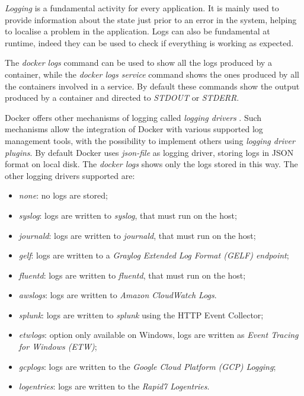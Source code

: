 \documentclass[a4paper,12pt]{article}
\begin{document}
\textit{Logging} is a fundamental activity for every application. It is mainly
used to provide information about the state just prior to an error in the
system, helping to localise a problem in the application. Logs can also be
fundamental at runtime, indeed they can be used to check if everything is
working as expected. \par The \textit{docker logs} command can be used to show
all the logs produced by a container, while the \textit{docker logs service}
command shows the ones produced by all the containers involved in a service. By
default these commands show the output produced by a container and directed to
\textit{STDOUT} or \textit{STDERR}. \par Docker offers other mechanisms of
logging called \textit{logging drivers} \cite{docker_logging_driver}. Such
mechanisms allow the integration of Docker with various supported log management
tools, with the possibility to implement others using \textit{logging driver
plugins}. By default Docker uses \textit{json-file} as logging driver, storing
logs in JSON format on local disk. The \textit{docker logs} shows only the logs
stored in this way. The other logging drivers supported are: 
\begin{itemize}
  \item \textit{none}: no logs are stored;
  \item \textit{syslog}: logs are written to \textit{syslog}, that must run on
  the host;
  \item \textit{journald}: logs are written to \textit{journald}, that must run on
  the host;
  \item \textit{gelf}: logs are written to a \textit{Graylog Extended Log Format
  (GELF) endpoint};
  \item \textit{fluentd}: logs are written to \textit{fluentd}, that must run on
  the host;
  \item \textit{awslogs}: logs are written to \textit{Amazon CloudWatch Logs}.
  \item \textit{splunk}: logs are written to \textit{splunk} using the HTTP
  Event Collector;
  \item \textit{etwlogs}: option only available on Windows, logs are written as
  \textit{Event Tracing for Windows (ETW)};
  \item \textit{gcplogs}: logs are written to the \textit{Google Cloud Platform
  (GCP) Logging};
  \item \textit{logentries}: logs are written to the \textit{Rapid7 Logentries}.
\end{itemize}
\end{document}
